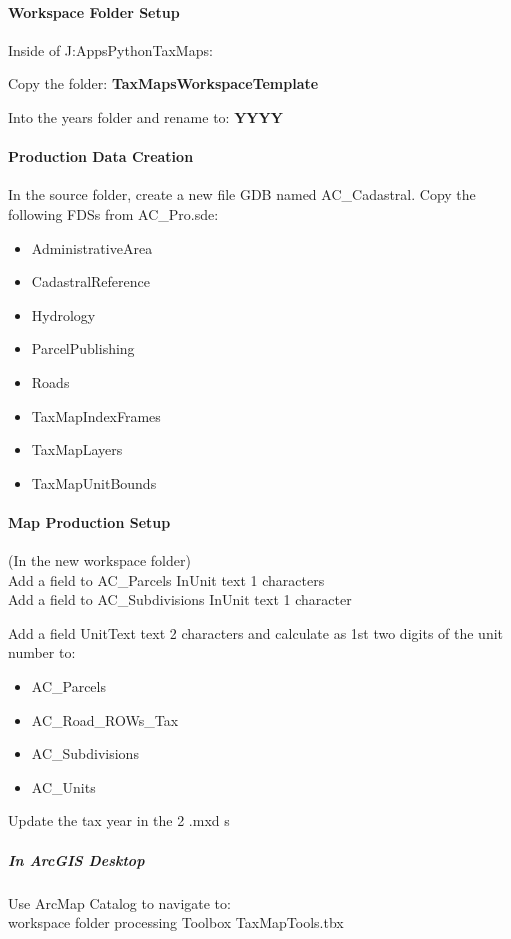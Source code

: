 \paragraph{Workspace Folder Setup}Inside of J:{\menuArrow}Apps{\menuArrow}Python{\menuArrow}TaxMaps:

\noindent Copy the folder: \textbf{TaxMapsWorkspaceTemplate}

\noindent Into the years folder and rename to: \textbf{YYYY}


\paragraph{Production Data Creation}In the source folder, create a new file GDB named AC\_Cadastral.  Copy the following FDSs from AC\_Pro.sde:
\begin{itemize}
\item AdministrativeArea
\item CadastralReference
\item Hydrology
\item ParcelPublishing
\item Roads
\item TaxMapIndexFrames
\item TaxMapLayers
\item TaxMapUnitBounds
\end{itemize}
\clearpage
\paragraph{Map Production Setup} (In the new workspace folder)\\
\noindent Add a field to AC\_Parcels InUnit text 1 characters\\
\noindent Add a field to AC\_Subdivisions InUnit text 1 character

\noindent Add a field UnitText text 2 characters and calculate as 1st two digits of the unit number to:
\begin{itemize}
\item AC\_Parcels
\item AC\_Road\_ROWs\_Tax
\item AC\_Subdivisions
\item AC\_Units
\end{itemize}

\noindent Update the tax year in the 2 .mxd s
\subparagraph{In ArcGIS Desktop}

Use ArcMap Catalog to navigate to:\\
workspace folder{\menuArrow} processing {\menuArrow} Toolbox {\menuArrow} TaxMapTools.tbx\\
\vspace{.25in}

